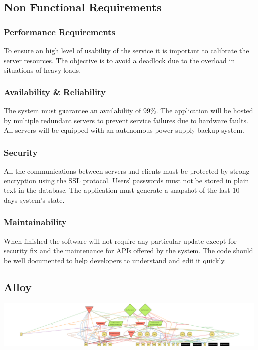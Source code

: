 \documentclass{article}
\begin{document}
			\vspace*{1cm}
		
		\subsection{Non Functional Requirements}
			\subsubsection{Performance Requirements}
			To ensure an high level of usability of the service it is important to calibrate the server resources. The objective is to avoid a deadlock due to the overload in situations of heavy loads.
			\subsubsection{Availability \& Reliability}
			The system must guarantee an availability of 99\%. The application will be hosted by multiple redundant servers to prevent service failures due to hardware faults. All servers will be equipped with an autonomous power supply backup system.
			
			\subsubsection{Security}
			All the communications between servers and clients must be protected by strong encryption using the SSL protocol. Users' passwords must not be stored in plain text in the database. The application must generate a snapshot of the last 10 days system's state.
			
			\subsubsection{Maintainability}
			When finished the software will not require any particular update except for security fix and the maintenance for APIs offered by the system. The code should be well documented to help developers to understand and edit it quickly.
			
		\pagebreak

		\subsection{Alloy}
		
		\pagebreak
		\includegraphics[angle=90,keepaspectratio=true,scale=0.26]{"img/alloy"}
		
\end{document}

